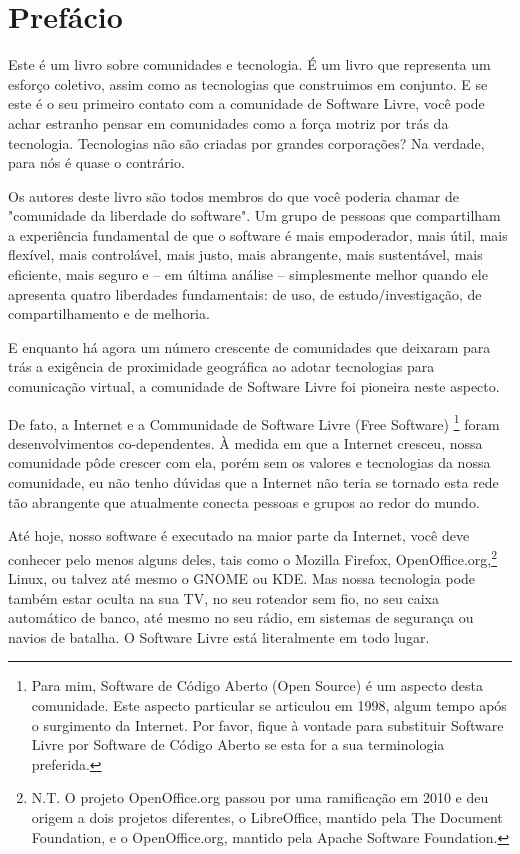\section*{Prefácio}

Este é um livro sobre comunidades e tecnologia. É um livro que
representa um esforço coletivo, assim como as tecnologias que
construimos em conjunto. E se este é o seu primeiro contato com
a comunidade de Software Livre, você pode achar estranho pensar
em comunidades como a força motriz por trás da tecnologia. Tecnologias
não são criadas por grandes corporações? Na verdade, para nós é
quase o contrário.

Os autores deste livro são todos membros do que você poderia chamar
de "comunidade da liberdade do software". Um grupo de pessoas que
compartilham a experiência fundamental de que o software é mais
empoderador, mais útil, mais flexível, mais controlável, mais justo,
mais abrangente, mais sustentável, mais eficiente, mais seguro e --
em última análise -- simplesmente melhor quando ele apresenta quatro
liberdades fundamentais: de uso, de estudo/investigação, de compartilhamento
e de melhoria.

E enquanto há agora um número crescente de comunidades que deixaram para
trás a exigência de proximidade geográfica ao adotar tecnologias para
comunicação virtual, a comunidade de Software Livre foi pioneira neste
aspecto.

De fato, a Internet e a Communidade de Software Livre (Free Software)
\footnote{Para mim, Software de Código Aberto (Open Source) é um aspecto
desta comunidade. Este aspecto particular se articulou em 1998, algum
tempo após o surgimento da Internet. Por favor, fique à vontade para
substituir Software Livre por Software de Código Aberto se esta for a
sua terminologia preferida.} foram desenvolvimentos co-dependentes. À
medida em que a Internet cresceu, nossa comunidade pôde crescer com ela,
porém sem os valores e tecnologias da nossa comunidade, eu não tenho
dúvidas que a Internet não teria se tornado esta rede tão abrangente
que atualmente conecta pessoas e grupos ao redor do mundo.

Até hoje, nosso software é executado na maior parte da Internet, você
deve conhecer pelo menos alguns deles, tais como o Mozilla Firefox,
OpenOffice.org,\footnote{N.T. O projeto OpenOffice.org passou por uma ramificação
em 2010 e deu origem a dois projetos diferentes, o LibreOffice, mantido pela
The Document Foundation, e o OpenOffice.org, mantido pela Apache Software Foundation.}
Linux, ou talvez até mesmo o GNOME ou KDE. Mas nossa
tecnologia pode também estar oculta na sua TV, no seu roteador sem fio,
no seu caixa automático de banco, até mesmo no seu rádio, em sistemas de
segurança ou navios de batalha. O Software Livre está literalmente em
todo lugar.

